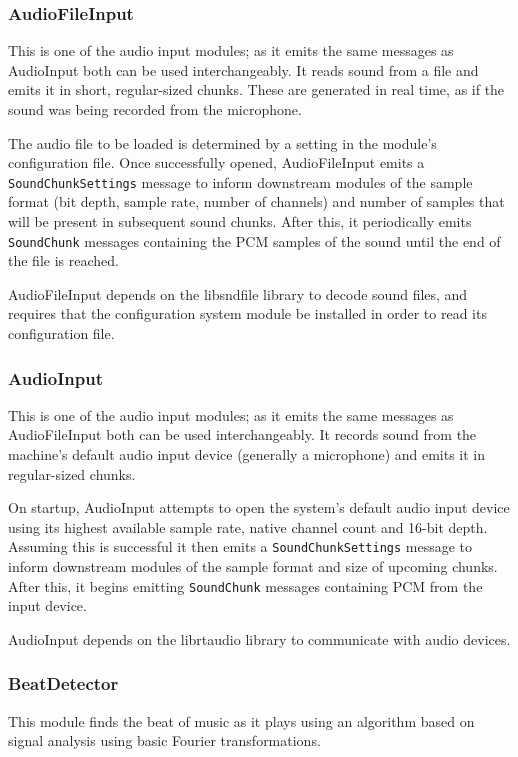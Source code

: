 \documentclass[english,12pt]{scrartcl}
\begin{document}
			
			\subsubsection{AudioFileInput}
				This is one of the audio input modules; as it emits the same messages as
				AudioInput both can be used interchangeably. It reads sound from a file and emits
				it in short, regular-sized chunks. These are generated in real time, as if the
				sound was being recorded from the microphone.
				
				The audio file to be loaded is determined by a setting in the module's
				configuration file. Once successfully opened, AudioFileInput emits a
				\texttt{SoundChunkSettings} message to inform downstream modules of the sample
				format (bit depth, sample rate, number of channels)	and number of samples that
				will be present in subsequent sound chunks. After this, it periodically emits
				\texttt{SoundChunk} messages containing the PCM samples of the sound until
				the end of the file is reached.
				
				AudioFileInput depends on the libsndfile library to decode sound files, and
				requires that the configuration system module be installed in order to read its
				configuration file.
			
			
			\subsubsection{AudioInput}
				This is one of the audio input modules; as it emits the same messages as
				AudioFileInput both can be used interchangeably. It records sound from the
				machine's default audio input device (generally a microphone) and emits it in
				regular-sized chunks.
				
				On startup, AudioInput attempts to open the system's default audio input device
				using its highest available sample rate, native channel count and 16-bit depth.
				Assuming this is successful it then emits a \texttt{SoundChunkSettings} message
				to inform downstream modules of the sample format and size of upcoming chunks.
				After this, it begins emitting \texttt{SoundChunk} messages containing PCM from
				the input device.
				
				AudioInput depends on the librtaudio library to communicate with audio devices.
				
				
			\subsubsection{BeatDetector}
				This module finds the beat of music as it plays using an algorithm based on signal analysis using basic Fourier transformations.
				
\end{document}
